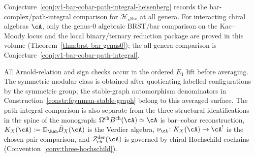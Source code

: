 \begin{remark}\label{rem:bar-path-integral-scope}
Conjecture~\ref{conj:v1-bar-cobar-path-integral-heisenberg} records
the bar-complex/path-integral comparison for
$\mathcal{H}_{\kappa^{\mathrm{Heis}}}$ at all genera.  For interacting
chiral algebras $\cA$, only the genus-$0$ algebraic BRST/bar
comparison on the Kac--Moody locus and the local binary/ternary
reduction package are proved in this volume
(Theorem~\ref{thm:brst-bar-genus0}); the all-genera comparison is
Conjecture~\ref{conj:v1-bar-cobar-path-integral}.

All Arnold-relation and sign checks occur in the ordered
$E_1$ lift before averaging.  The symmetric modular class is obtained
after quotienting labelled configurations by the symmetric group; the
stable-graph automorphism denominators in
Construction~\ref{constr:feynman-stable-graph} belong to this
averaged surface.  The path-integral comparison is also separate from
the three structural identifications in the spine of the monograph:
$\Omega^{\mathrm{ch}}\bar{B}^{\mathrm{ch}}(\cA)\simeq\cA$ is
bar--cobar reconstruction,
$K_X(\cA):=\mathbb{D}_{\Ran}\bar{B}_X(\cA)$ is the Verdier algebra,
$\nu_\cA\colon K_X(\cA)\to\cA^!$ is the chosen-pair comparison, and
$Z^{\mathrm{der}}_{\mathrm{ch}}(\cA)$ is governed by chiral
Hochschild cochains (Convention~\ref{conv:three-hochschild}).
\end{remark}
